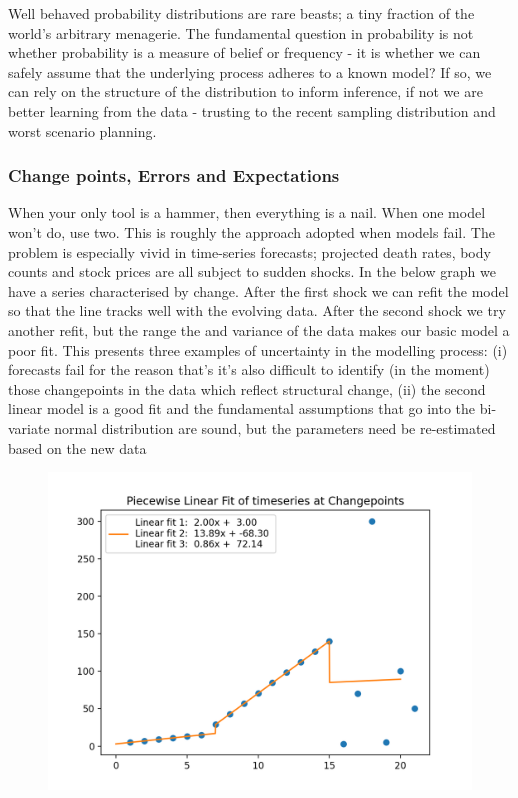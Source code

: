 \documentclass[10pt,a4paper,notitlepage,twocolumn]{article}
\begin{document}
Well behaved probability distributions are rare beasts; a tiny fraction of the world's arbitrary menagerie. The fundamental question in probability is not whether probability is a measure of belief or frequency - it is whether we can safely assume that the underlying process adheres to a known model? If so, we can rely on the structure of the distribution to inform inference, if not we are better learning from the data - trusting to the recent sampling distribution and worst scenario planning.

\subsubsection*{Change points, Errors and Expectations}
When your only tool is a hammer, then everything is a nail. When one model won't do, use two. This is roughly the approach adopted when models fail. The problem is especially vivid in time-series forecasts; projected death rates, body counts and stock prices are all subject to sudden shocks. In the below graph we have a series characterised by change. After the first shock we can refit the model so that the line tracks well with the evolving data. After the second shock we try another refit, but the range the and variance of the data makes our basic model a poor fit. This presents three examples of uncertainty in the modelling process: (i) forecasts fail for the reason that's it's also difficult to identify (in the moment) those changepoints in the data which reflect structural change, (ii) the second linear model is a good fit and the fundamental assumptions that go into the bi-variate normal distribution are sound, but the parameters need be re-estimated based on the new data
\begin{figure}[H]
  \includegraphics[width=\linewidth]{./Plots/piecewise_linear_fits.png}
\end{figure}
\end{document}

